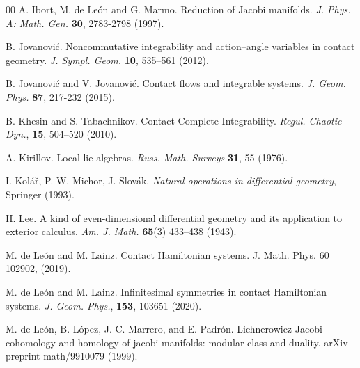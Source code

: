 \documentclass[10pt]{amsart}
\numberwithin{equation}{section}
\newcommand{\tbf}{\textbf}
\theoremstyle{definition}
\begin{document}
\begin{thebibliography}{00}
 A. Ibort, M. de Le\'on and G. Marmo. Reduction of Jacobi manifolds. \textit{J. Phys. A: Math. Gen.} \tbf{30}, 2783-2798 (1997).

 B. Jovanović. Noncommutative integrability and action--angle variables in contact geometry.  \textit{J. Sympl. Geom.} \textbf{10}, 535–561 (2012).

 B. Jovanović and V. Jovanović. Contact flows and integrable systems. \textit{J. Geom.  Phys.} \textbf{87}, 217-232 (2015).

 B. Khesin and S. Tabachnikov. Contact Complete Integrability. \textit{Regul. Chaotic Dyn.},
\textbf{15}, 504–520 (2010).

 A. Kirillov. Local lie algebras. \textit{Russ. Math. Surveys} \tbf{31}, 55 (1976).

	I. Kol\'a\v{r}, P. W. Michor, J. Slov\'ak. \textit{Natural operations in differential geometry}, Springer (1993).



 H. Lee. A kind of even-dimensional differential geometry and its application to exterior calculus. \textit{Am. J. Math.} \tbf{65}(3) 433--438 (1943).

 M. de León and M. Lainz. Contact Hamiltonian systems. J. Math. Phys. 60 102902, (2019).

 M. de Le\'on and M. Lainz. Infinitesimal symmetries in contact Hamiltonian systems. \textit{J. Geom. Phys.}, \tbf{153}, 103651 (2020).


 M. de Le\'on, B. L\'opez, J. C. Marrero, and E. Padr\'on. Lichnerowicz-Jacobi cohomology and homology of
jacobi manifolds: modular class and duality. arXiv preprint math/9910079 (1999).



\end{thebibliography}
\end{document}
